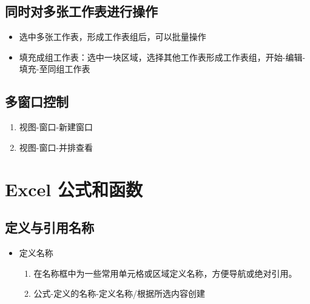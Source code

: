 \documentclass[]{ctexbook}
\providecommand{\tightlist}{%
  \setlength{\itemsep}{0pt}\setlength{\parskip}{0pt}}
\begin{document}
\hypertarget{ux540cux65f6ux5bf9ux591aux5f20ux5de5ux4f5cux8868ux8fdbux884cux64cdux4f5c}{%
\section{同时对多张工作表进行操作}\label{ux540cux65f6ux5bf9ux591aux5f20ux5de5ux4f5cux8868ux8fdbux884cux64cdux4f5c}}

\begin{itemize}
\tightlist
\item
  选中多张工作表，形成工作表组后，可以批量操作
\item
  填充成组工作表：选中一块区域，选择其他工作表形成工作表组，开始-编辑-填充-至同组工作表
\end{itemize}

\hypertarget{ux591aux7a97ux53e3ux63a7ux5236}{%
\section{多窗口控制}\label{ux591aux7a97ux53e3ux63a7ux5236}}

\begin{enumerate}
\def\labelenumi{\arabic{enumi}.}
\tightlist
\item
  视图-窗口-新建窗口\\
\item
  视图-窗口-并排查看
\end{enumerate}

\hypertarget{excel-ux516cux5f0fux548cux51fdux6570}{%
\chapter{Excel 公式和函数}\label{excel-ux516cux5f0fux548cux51fdux6570}}

\hypertarget{ux5b9aux4e49ux4e0eux5f15ux7528ux540dux79f0}{%
\section{定义与引用名称}\label{ux5b9aux4e49ux4e0eux5f15ux7528ux540dux79f0}}

\begin{itemize}
\tightlist
\item
  定义名称

  \begin{enumerate}
  \def\labelenumi{\arabic{enumi}.}
  \tightlist
  \item
    在名称框中为一些常用单元格或区域定义名称，方便导航或绝对引用。
  \item
    公式-定义的名称-定义名称/根据所选内容创建
  \end{enumerate}
\end{itemize}
\end{document}
